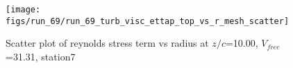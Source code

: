 \begin{figure}[H]
\centering
\texttt{[image: figs/run\_69/run\_69\_turb\_visc\_ettap\_top\_vs\_r\_mesh\_scatter]}
\caption{Scatter plot of reynolds stress term vs radius at $z/c$=10.00, $V_{free}$=31.31, station7}
\label{fig:run_69_turb_visc_ettap_top_vs_r_mesh_scatter}
\end{figure}


